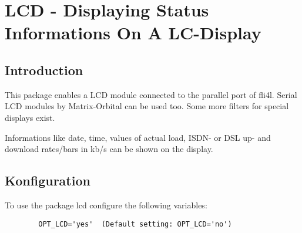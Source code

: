 {
  \section {LCD - Displaying Status Informations On A LC-Display}
}

\subsection{Introduction}


    This package enables a LCD module connected to the parallel port of 
    fli4l. Serial LCD modules by Matrix-Orbital can be used too.
    Some more filters for special displays exist.

    Informations like date, time, values of actual load, ISDN- or DSL 
    up- and download rates/bars in kb/s can be shown on the display.


\subsection{Konfiguration}


    To use the package lcd configure the following variables:

\begin{example}
\begin{verbatim}
        OPT_LCD='yes'  (Default setting: OPT_LCD='no')
\end{verbatim}
\end{example}


